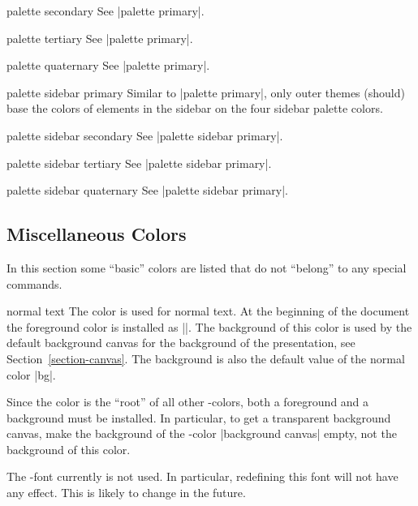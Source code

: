 \begin{element}{palette secondary}\no\yes\no
  See |palette primary|.
\end{element}

\begin{element}{palette tertiary}\no\yes\no
  See |palette primary|.
\end{element}

\begin{element}{palette quaternary}\no\yes\no
  See |palette primary|.
\end{element}

\begin{element}{palette sidebar primary}\no\yes\no
  Similar to |palette primary|, only outer themes (should) base the colors of elements in the sidebar on the four sidebar palette colors.
\end{element}

\begin{element}{palette sidebar secondary}\no\yes\no
  See |palette sidebar primary|.
\end{element}

\begin{element}{palette sidebar tertiary}\no\yes\no
  See |palette sidebar primary|.
\end{element}

\begin{element}{palette sidebar quaternary}\no\yes\no
  See |palette sidebar primary|.
\end{element}


\subsection{Miscellaneous Colors}

In this section some ``basic'' colors are listed that do not ``belong'' to any special commands.

\begin{element}{normal text}\no\yes\yes
  The color is used for normal text. At the beginning of the document the foreground color is installed as |\normalcolor|. The background of this color is used by the default background canvas for the background of the presentation, see Section~\ref{section-canvas}. The background is also the default value of the normal color |bg|.

  Since the color is the ``root'' of all other \beamer-colors, both a foreground and a background must be installed. In particular, to get a transparent background canvas, make the background of the \beamer-color |background canvas| empty, not the background of this color.

  The \beamer-font currently is not used. In particular, redefining this font will not have any effect. This is likely to change in the future.
\end{element}

